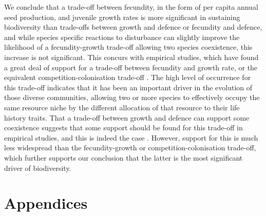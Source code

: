 We conclude that a trade-off between fecundity, in the form of per capita annual seed production, and juvenile growth rates is more significant in sustaining biodiversity than trade-offs between growth and defence or fecundity and defence, and while species specific reactions to disturbance can slightly improve the likelihood of a fecundity-growth trade-off allowing two species coexistence, this increase is not significant. This concurs with empirical studies, which have found a great deal of support for a trade-off between fecundity and growth rate, or the equivalent competition-colonisation trade-off \citep[e.g.][]{levins1971regional,yu2001competition,tilman1994competition,adler2000space}. The high level of occurrence for this trade-off indicates that it has been an important driver in the evolution of those diverse communities, allowing two or more species to effectively occupy the same resource niche by the different allocation of that resource to their life history traits. That a trade-off between growth and defence can support some coexistence suggests that some support should be found for this trade-off in empirical studies, and this is indeed the case \citep[e.g.][]{wright2010functional,fine2006growth}. However, support for this is much less widespread than the fecundity-growth or competition-colonisation trade-off, which further supports our conclusion that the latter is the most significant driver of biodiversity.

\section*{Appendices}

\bappendix
